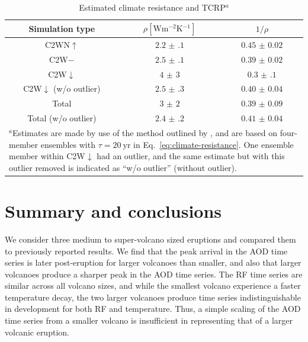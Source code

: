 \documentclass[draft]{agujournal2019}
\newcommand{\cwmp}{C2W\(-\)}
\newcommand{\cwm}{C2W\(\downarrow\)}
\newcommand{\cws}{C2WN\(\uparrow\)}
\begin{document}
\begin{table}
  \centering

  \caption{Estimated climate resistance and TCRP\(^{a}\)}\label{tab:trcp}%
  \begin{tabular}{ccc}
    \toprule
    Simulation type      & \(\rho [\si{\watt\metre^{-2}\kelvin^{-1}}]\) & \(1/\rho\)        \\
    \midrule
    \cws{}               & \(\num{2.2(1)}\)                             & \(\num{0.45(2)}\) \\
    \cwmp{}              & \(\num{2.5(1)}\)                             & \(\num{0.39(2)}\) \\
    \cwm{}               & \(\num{4(3)}\)                               & \(\num{0.3(1)}\)  \\
    \cwm{} (w/o outlier) & \(\num{2.5(3)}\)                             & \(\num{0.40(4)}\) \\
    Total                & \(\num{3(2)}\)                               & \(\num{0.39(9)}\) \\
    Total (w/o outlier)  & \(\num{2.4(2)}\)                             & \(\num{0.41(4)}\) \\
    \toprule
    \multicolumn{3}{l}{\parbox{\linewidth}{\(^{a}\)Estimates are made by use of the method outlined by
        , and are based on four-member ensembles with \(\tau
        =\SI{20}{\mathrm{yr}}\) in Eq.~\ref{eq:climate-resistance}. One ensemble member
        within \cwm{} had an outlier, and the same estimate but with this outlier removed is
    indicated as ``w/o outlier'' (without outlier).}}                                       \\
  \end{tabular}
\end{table}


\section{Summary and conclusions}\label{sec:conclusions}

We consider three medium to super-volcano sized eruptions and compared them to
previously reported results. We find that the peak arrival in the AOD time series is
later post-eruption for larger volcanoes than smaller, and also that larger volcanoes
produce a sharper peak in the AOD time series. The RF time series are similar across all
volcano sizes, and while the smallest volcano experience a faster temperature decay, the
two larger volcanoes produce time series indistinguishable in development for both RF
and temperature. Thus, a simple scaling of the AOD time series from a smaller volcano is
insufficient in representing that of a larger volcanic eruption.
\end{document}
